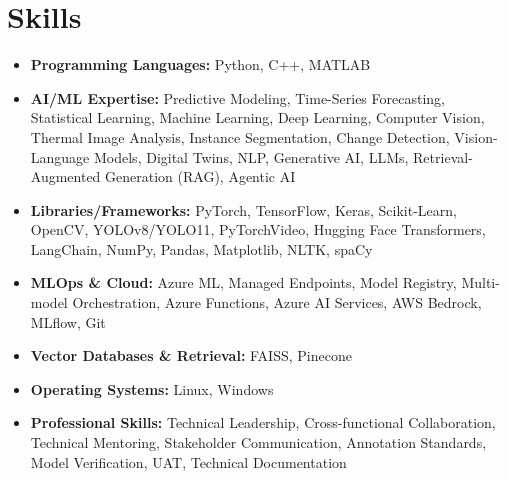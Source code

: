 \documentclass[a4paper,10pt]{article}
\begin{document}
\section*{Skills}
\begin{itemize}
	\item \textbf{Programming Languages:} Python, C++, MATLAB
	
	\item \textbf{AI/ML Expertise:} Predictive Modeling, Time-Series Forecasting, Statistical Learning, Machine Learning, Deep Learning, Computer Vision, Thermal Image Analysis, Instance Segmentation, Change Detection, Vision-Language Models, Digital Twins, NLP, Generative AI, LLMs, Retrieval-Augmented Generation (RAG), Agentic AI
	
	\item \textbf{Libraries/Frameworks:} PyTorch, TensorFlow, Keras, Scikit-Learn, OpenCV, YOLOv8/YOLO11, PyTorchVideo, Hugging Face Transformers, LangChain, NumPy, Pandas, Matplotlib, NLTK, spaCy
	
	\item \textbf{MLOps \& Cloud:} Azure ML, Managed Endpoints, Model Registry, Multi-model Orchestration, Azure Functions, Azure AI Services, AWS Bedrock, MLflow, Git
	
	\item \textbf{Vector Databases \& Retrieval:} FAISS, Pinecone
	
	\item \textbf{Operating Systems:} Linux, Windows
	
	\item \textbf{Professional Skills:} Technical Leadership, Cross-functional Collaboration, Technical Mentoring, Stakeholder Communication, Annotation Standards, Model Verification, UAT, Technical Documentation
\end{itemize}
	

	
\end{document}
